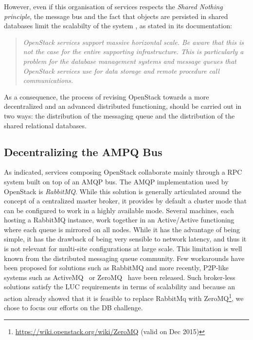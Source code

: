 However, even if this organisation of services respects the \textit{Shared Nothing principle}, the message bus and the fact that objects are persisted
in shared databases limit the scalabilty of the system%
, as stated in its documentation:

\begin{quote}
  \textit{OpenStack services support massive horizontal scale. Be aware that this is not the case for the entire supporting infrastructure. This is
    particularly a problem for the database management systems and message queues that OpenStack services use for data storage and remote procedure
    call communications.}
\end{quote}

As a consequence, the process of revising OpenStack towards a more decentralized and an advanced distributed functioning, should be carried out in
two ways: the distribution of the messaging queue and the distribution of the shared relational databases.

\subsection{Decentralizing the AMPQ Bus}

As indicated, services composing OpenStack collaborate mainly through a RPC system built on top of an AMQP bus. The AMQP implementation used by OpenStack
is \textit{RabbitMQ}. While this solution is generally articulated around the concept of a centralized master broker, it provides by default a cluster
mode that can be configured to work in a highly available mode. Several machines, each hosting a RabbitMQ instance, work together in an Active/Active
functioning where each queue is mirrored on all nodes. %
While it has the advantage of being simple, it has the drawback of being very sensible to network latency, and thus it is not relevant for multi-site
configurations at large scale. This limitation is well known from the distributed messaging queue community. Few workarounds have been proposed for
solutions such as RabbitMQ and more recently, P2P-like systems such as ActiveMQ~\cite{activemq:2011} or ZeroMQ~\cite{zeromq:2013} have been released.
Such broker-less solutions satisfy the LUC requirements in terms of scalability and because an action already showed that it is feasible to replace
RabbitMq with ZeroMQ\footnote{\url{https://wiki.openstack.org/wiki/ZeroMQ} (valid on Dec 2015)}, we chose to focus our efforts on the DB challenge.

